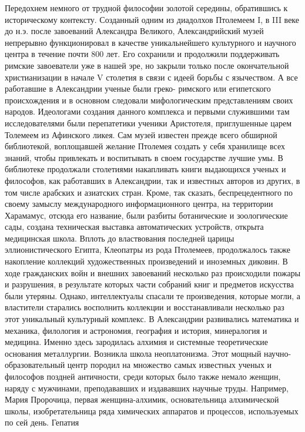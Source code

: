 Передохнем
немного от трудной философии золотой середины, обратившись к историческому
контексту. Созданный одним из диадолхов Птолемеем I, в III веке до н.э. после
завоеваний Александра Великого, Александрийский музей непрерывно функционировал
в качестве уникальнейшего культурного и научного центра в течение почти 800 лет.
Его сохранили и продолжили поддерживать римские завоеватели уже в нашей эре, но
закрыли только после окончательной христианизации в начале V столетия в связи с
идеей борьбы с язычеством. А все работавшие в Александрии ученые были греко-
римского или египетского происхождения и в основном следовали мифологическим
представлениям своих народов. Идеологами создания данного комплекса и первыми
служившими там исследователями были перепатетики ученики Аристотеля,
приглушенные царем Толемеем из Афинского ликея. Сам музей известен прежде всего
обширной библиотекой, воплощавшей желание Птолемея создать у себя хранилище всех
знаний, чтобы привлекать и воспитывать в своем государстве лучшие умы. В
библиотеке продолжали столетиями накапливать книги выдающихся ученых и
философов, как работавших в Александрии, так и известных авторов из других, в
том числе арабских и азиатских стран. Кроме, так сказать, беспрецедентного по
своему замыслу международного информационного центра, на территории Харамамус,
отсюда его название, были разбиты ботанические и зоологические сады, создана
техническая выставка автоматических устройств, открыта медицинская школа. Вплоть
до властвования последней царицы эллионистического Египта, Клеопатры из рода
Птолемеев, продолжалось также накопление коллекций художественных произведений и
иноземных диковин. В ходе гражданских войн и внешних завоеваний несколько раз
происходили пожары и разрушения, в результате которых части собраний книг и
предметов искусства были утеряны. Однако, интеллектуалы спасали те произведения,
которые могли, а властители старались восполнить коллекции и восстанавливали
несколько раз этот уникальный культурный комплекс. В Александрии развивались
математика и механика, филология и астрономия, география и история, минералогия
и медицина. Именно здесь зародилась алхимия и системные теоретические основания
металлургии. Возникла школа неоплатонизма. Этот мощный научно-образовательный
центр породил на множество самых известных ученых и философов поздней
античности, среди которых было также немало женщин, наряду с мужчинами,
преподававших и издававших научные труды. Например, Мария Пророчица, первая
женщина-алхимик, основательница алхимической школы, изобретательница ряда
химических аппаратов и процессов, используемых по сей день. Гепатия
